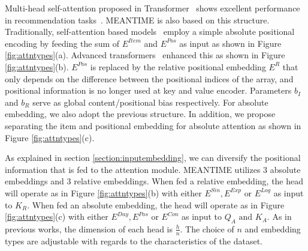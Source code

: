 Multi-head self-attention proposed in Transformer~\cite{TRANSFORMER} shows excellent performance in recommendation tasks~\cite{BERT4Rec}. MEANTIME is also based on this structure. Traditionally, self-attention based models~\cite{SASRec, BERT, BERT4Rec} employ a simple absolute positional encoding by feeding the sum of $E^{Item}$ and $E^{Pos}$ as input as shown in Figure \ref{fig:attntypes}(a). Advanced transformers~\cite{TRANSFORMER-XL, XLNET} enhanced this as shown in Figure \ref{fig:attntypes}(b). $E^{Pos}$ is replaced by the relative positional embedding $E^R$ that only depends on the difference between the positional indices of the array, and positional information is no longer used at key and value encoder. Parameters $b_I$ and $b_R$ serve as global content/positional bias respectively. For absolute embedding, we also adopt the previous structure. In addition, we propose separating the item and positional embedding for absolute attention as shown in Figure \ref{fig:attntypes}(c).

As explained in section \ref{section:inputembedding}, we can diversify the positional information that is fed to the attention module. MEANTIME utilizes 3 absolute embeddings and 3 relative embeddings. When fed a relative embedding, the head will operate as in Figure \ref{fig:attntypes}(b) with either $E^{Sin},E^{Exp}\text{ or }E^{Log}$ as input to $K_R$. When fed an absolute embedding, the head will operate as in Figure \ref{fig:attntypes}(c) with either $E^{Day},E^{Pos}\text{ or }E^{Con}$ as input to $Q_A\text{ and } K_A$.
As in previous works, the dimension of each head is $\frac{h}{n}$. The choice of $n$ and embedding types are adjustable with regards to the characteristics of the dataset.


